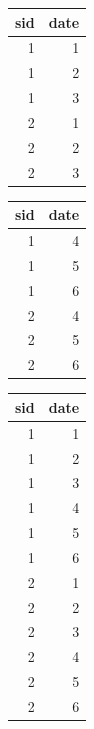 \documentclass[
]{book}
\newenvironment{Shaded}{\begin{snugshade}}{\end{snugshade}}
\newcommand{\KeywordTok}[1]{\textcolor[rgb]{0.13,0.29,0.53}{\textbf{#1}}}
\newcommand{\NormalTok}[1]{#1}
\newcommand{\OperatorTok}[1]{\textcolor[rgb]{0.81,0.36,0.00}{\textbf{#1}}}
\newcommand{\StringTok}[1]{\textcolor[rgb]{0.31,0.60,0.02}{#1}}
\begin{document}
\begin{table}[!h]
\centering
\begin{tabular}{r|r}
\hline
sid & date\\
\hline
\rowcolor{gray!6}  1 & 1\\
\hline
1 & 2\\
\hline
\rowcolor{gray!6}  1 & 3\\
\hline
2 & 1\\
\hline
\rowcolor{gray!6}  2 & 2\\
\hline
2 & 3\\
\hline
\end{tabular}
\end{table}

\begin{Shaded}
\end{Shaded}

\begin{table}[!h]
\centering
\begin{tabular}{r|r}
\hline
sid & date\\
\hline
\rowcolor{gray!6}  1 & 4\\
\hline
1 & 5\\
\hline
\rowcolor{gray!6}  1 & 6\\
\hline
2 & 4\\
\hline
\rowcolor{gray!6}  2 & 5\\
\hline
2 & 6\\
\hline
\end{tabular}
\end{table}

\begin{Shaded}
\end{Shaded}

\begin{table}[!h]
\centering
\begin{tabular}{r|r}
\hline
sid & date\\
\hline
\rowcolor{gray!6}  1 & 1\\
\hline
1 & 2\\
\hline
\rowcolor{gray!6}  1 & 3\\
\hline
1 & 4\\
\hline
\rowcolor{gray!6}  1 & 5\\
\hline
1 & 6\\
\hline
\rowcolor{gray!6}  2 & 1\\
\hline
2 & 2\\
\hline
\rowcolor{gray!6}  2 & 3\\
\hline
2 & 4\\
\hline
\rowcolor{gray!6}  2 & 5\\
\hline
2 & 6\\
\hline
\end{tabular}
\end{table}
\end{document}
